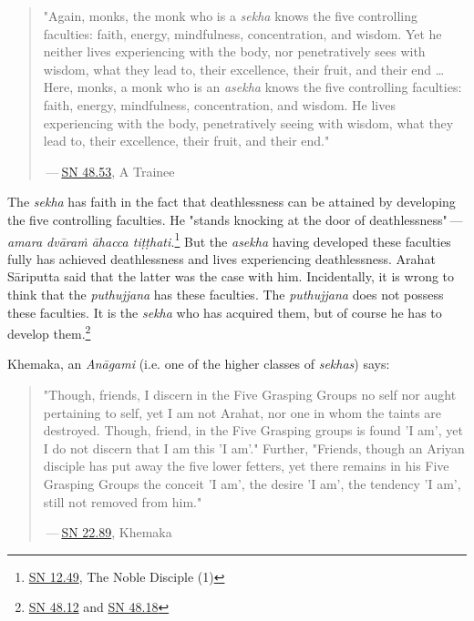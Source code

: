 \begin{quote}
"Again, monks, the monk who is a \emph{sekha} knows the five controlling faculties: faith, energy, mindfulness, concentration, and wisdom. Yet he neither lives experiencing with the body, nor penetratively sees with wisdom, what they lead to, their excellence, their fruit, and their end \ldots\hspace{0pt} Here, monks, a monk who is an \emph{asekha} knows the five controlling faculties: faith, energy, mindfulness, concentration, and wisdom. He lives experiencing with the body, penetratively seeing with wisdom, what they lead to, their excellence, their fruit, and their end."

 --- \href{https://suttacentral.net/sn48.53/en/sujato}{SN 48.53}, A Trainee
\end{quote}

The \emph{sekha} has faith in the fact that deathlessness can be attained by developing the five controlling faculties. He "stands knocking at the door of deathlessness" --- \emph{amara dvāraṁ āhacca tiṭṭhati.}\footnote{\href{https://suttacentral.net/sn12.49/en/bodhi}{SN 12.49}, The Noble Disciple (1)} But the \emph{asekha} having developed these faculties fully has achieved deathlessness and lives experiencing deathlessness. Arahat Sāriputta said that the latter was the case with him. Incidentally, it is wrong to think that the \emph{puthujjana} has these faculties. The \emph{puthujjana} does not possess these faculties. It is the \emph{sekha} who has acquired them, but of course he has to develop them.\footnote{\href{https://suttacentral.net/sn48.12/en/sujato}{SN 48.12} and \href{https://suttacentral.net/sn48.18/en/sujato}{SN 48.18}}

Khemaka, an \emph{Anāgami} (i.e. one of the higher classes of \emph{sekhas}) says:

\begin{quote}
"Though, friends, I discern in the Five Grasping Groups no self nor aught pertaining to self, yet I am not Arahat, nor one in whom the taints are destroyed. Though, friend, in the Five Grasping groups is found 'I am', yet I do not discern that I am this 'I am'." Further, "Friends, though an Ariyan disciple has put away the five lower fetters, yet there remains in his Five Grasping Groups the conceit 'I am', the desire 'I am', the tendency 'I am', still not removed from him."

 --- \href{https://suttacentral.net/sn22.89/en/bodhi}{SN 22.89}, Khemaka
\end{quote}

